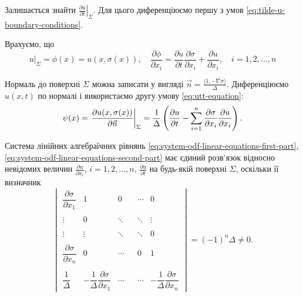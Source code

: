 Залишається знайти $\left. \frac{\partial u}{\partial t} \right|_\Sigma$. Для цього диференціюємо першу з умов \eqref{eq:tilde-u-boundary-conditions}. \medskip

Врахуємо, що
\begin{equation}
    \label{eq:system-odf-linear-equations-first-part}
    \left. u \right|_\Sigma = \phi(x) = u(x, \sigma(x)), \quad \frac{\partial \phi}{\partial x_i} = \frac{\partial u}{\partial t} \frac{\partial \sigma}{\partial x_i} + \frac{\partial u}{\partial x_i}, \quad i = 1, 2, \ldots, n
\end{equation}

Нормаль до поверхні $\Sigma$ можна записати у вигляді $\vec n = \frac{\langle 1, - \nabla \sigma \rangle}{\Delta}$. Диференціюємо $u(x, t)$ по нормалі і використаємо другу умову \eqref{eq:utt-equation}:
\begin{equation}
    \label{eq:system-odf-linear-equations-second-part}
    \psi(x) = \left. \frac{\partial u(x, \sigma(x))}{\partial \vec n} \right|_\Sigma = \frac{1}{\Delta} \left( \frac{\partial u}{\partial t} - \displaystyle\sum\limits_{i = 1}^n \frac{\partial \sigma}{\partial x_i} \frac{\partial u}{\partial x_i} \right).
\end{equation}

Система лінійних алгебраїчних рівнянь \eqref{eq:system-odf-linear-equations-first-part}, \eqref{eq:system-odf-linear-equations-second-part} має єдиний розв'язок відносно невідомих величин $\frac{\partial u}{\partial x_i}$, $i = 1, 2, \ldots, n$, $\frac{\partial u}{\partial t}$ на будь-якій поверхні $\Sigma$, оскільки її визначник
\begin{equation}
    \begin{vmatrix}
        \dfrac{\partial \sigma}{\partial x_1} & 1 & 0 & & \cdots & 0 \\
        \\
        \vdots & 0 & \ddots & & \ddots & \vdots \\
        \\
        \vdots & \vdots & \ddots & & \ddots & 0 \\
        \\
        \dfrac{\partial \sigma}{\partial x_n} & 0 & \cdots & & 0 & 1 \\
        \\
        \dfrac{1}{\Delta} & -\dfrac{1}{\Delta} \dfrac{\partial \sigma}{\partial x_1} & \cdots & & \cdots & - \dfrac{1}{\Delta} \dfrac{\partial \sigma}{\partial x_n}
    \end{vmatrix} = (-1)^n \Delta \ne 0.
\end{equation}

